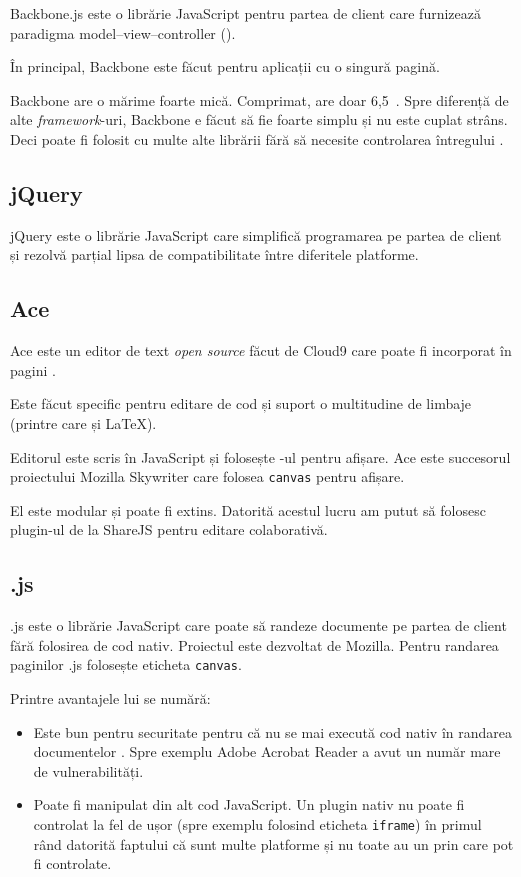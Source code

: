 \documentclass[a4wide,12pt]{report}
\newcommand{\eng}[1]{\emph{#1}} %
\newcommand{\cod}[1]{\texttt{#1}}
\newcommand{\acr}[1]{{\textsmaller[1]{\textsc{#1}}}} %
\begin{document}
Backbone.js\cite{backbone} este o librărie JavaScript pentru partea de client
care furnizează paradigma model--view--controller (\acr{MVC}).

În principal, Backbone este făcut pentru aplicații cu o singură pagină.

Backbone are o mărime foarte mică. Comprimat, are doar 6,5~\acr{KiB}. Spre
diferență de alte \eng{framework}-uri, Backbone e făcut să fie foarte simplu și
nu este cuplat strâns. Deci poate fi folosit cu multe alte librării fără să
necesite controlarea întregului \acr{DOM}.

\subsection{jQuery}

jQuery este o librărie JavaScript care simplifică programarea pe partea de
client și rezolvă parțial lipsa de compatibilitate între diferitele platforme.

\subsection{Ace}
\label{acesub}

Ace\cite{ace} este un editor de text \eng{open source} făcut de Cloud9 care
poate fi incorporat în pagini \acr{HTML}.

Este făcut specific pentru editare de cod și suport o multitudine de limbaje
(printre care și \LaTeX{}).

Editorul este scris în JavaScript și folosește \acr{DOM}-ul pentru afișare. Ace
este succesorul proiectului Mozilla Skywriter care folosea \cod{canvas} pentru
afișare.

El este modular și poate fi extins. Datorită acestul lucru am putut să folosesc
plugin-ul de la ShareJS pentru editare colaborativă.

\subsection{\acr{PDF}.js}

\acr{PDF}.js este o librărie JavaScript care poate să randeze documente
\acr{PDF} pe partea de client fără folosirea de cod nativ. Proiectul este
dezvoltat de Mozilla. Pentru randarea paginilor \acr{PDF}.js folosește eticheta
\cod{canvas}.

Printre avantajele lui se numără:

\begin{itemize}

\item Este bun pentru securitate pentru că nu se mai execută cod nativ în
randarea documentelor \acr{PDF}. Spre exemplu Adobe Acrobat Reader a avut un
număr mare de vulnerabilități.

\item Poate fi manipulat din alt cod JavaScript. Un plugin nativ nu poate fi
controlat la fel de ușor (spre exemplu folosind eticheta \cod{iframe}) în primul
rând datorită faptului că sunt multe platforme și nu toate au un \acr{API} prin
care pot fi controlate.

\end{itemize}
\end{document}
